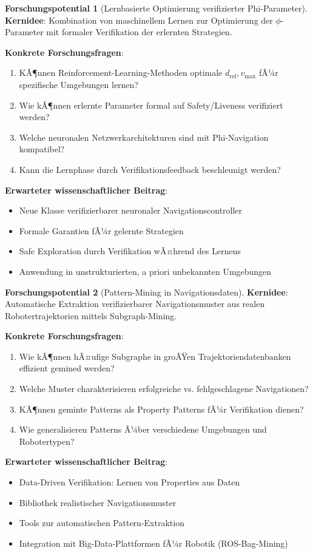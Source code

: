 ﻿\documentclass[a4paper,12pt]{article}
\theoremstyle{definition}
\newtheorem{potential}{Forschungspotential}[section]
\begin{document}
\begin{potential}[Lernbasierte Optimierung verifizierter Phi-Parameter]
\textbf{Kernidee}: Kombination von maschinellem Lernen zur Optimierung der $\phi$-Parameter mit formaler Verifikation der erlernten Strategien.

\textbf{Konkrete Forschungsfragen}:
\begin{enumerate}
	\item KÃ¶nnen Reinforcement-Learning-Methoden optimale $d_{\text{ref}}, v_{\max}$ fÃ¼r spezifische Umgebungen lernen?
	\item Wie kÃ¶nnen erlernte Parameter formal auf Safety/Liveness verifiziert werden?
	\item Welche neuronalen Netzwerkarchitekturen sind mit Phi-Navigation kompatibel?
	\item Kann die Lernphase durch Verifikationsfeedback beschleunigt werden?
\end{enumerate}

\textbf{Erwarteter wissenschaftlicher Beitrag}:
\begin{itemize}
	\item Neue Klasse verifizierbarer neuronaler Navigationscontroller
	\item Formale Garantien fÃ¼r gelernte Strategien
	\item Safe Exploration durch Verifikation wÃ¤hrend des Lernens
	\item Anwendung in unstrukturierten, a priori unbekannten Umgebungen
\end{itemize}
\end{potential}

\begin{potential}[Pattern-Mining in Navigationsdaten]
\textbf{Kernidee}: Automatische Extraktion verifizierbarer Navigationsmuster aus realen Robotertrajektorien mittels Subgraph-Mining.

\textbf{Konkrete Forschungsfragen}:
\begin{enumerate}
	\item Wie kÃ¶nnen hÃ¤ufige Subgraphe in groÃŸen Trajektoriendatenbanken effizient gemined werden?
	\item Welche Muster charakterisieren erfolgreiche vs. fehlgeschlagene Navigationen?
	\item KÃ¶nnen geminte Patterns als Property Patterns fÃ¼r Verifikation dienen?
	\item Wie generalisieren Patterns Ã¼ber verschiedene Umgebungen und Robotertypen?
\end{enumerate}

\textbf{Erwarteter wissenschaftlicher Beitrag}:
\begin{itemize}
	\item Data-Driven Verifikation: Lernen von Properties aus Daten
	\item Bibliothek realistischer Navigationsmuster
	\item Tools zur automatischen Pattern-Extraktion
	\item Integration mit Big-Data-Plattformen fÃ¼r Robotik (ROS-Bag-Mining)
\end{itemize}
\end{potential}
\end{document}
